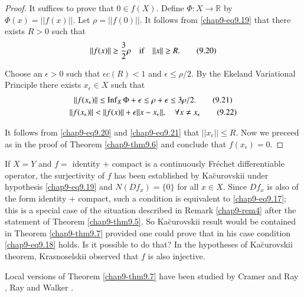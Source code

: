 \begin{proof}
It suffices to prove that $0\in f(X)$. Define $\Phi:X\to \mathbb{R}$
by $\Phi(x)=||f(x)||$. Let $\rho=||f(0)||$. It follows from
\eqref{chap9-eq9.19} that there exists $R>0$ such that
\begin{equation*}
||f(x)||\geq \frac{3}{2}\rho\quad \text{if}\quad ||x||\geq
R.\tag{9.20}\label{chap9-eq9.20} 
\end{equation*}

Choose an $\epsilon>0$ such that $\epsilon c(R)<1$ and $\epsilon\leq
\rho/2$. By the Ekeland Variational Principle there exists
$x_{\epsilon}\in X$ such that
\begin{gather*}
||f(x_{\epsilon})||\leq \Inf_{X}\Phi+\epsilon\leq \rho+\epsilon\leq
3\rho/2.\tag{9.21}\label{chap9-eq9.21}\\
||f(x_{\epsilon})||<||f(x)||+\epsilon||x-x_{\epsilon}||,\q\forall
x\neq x_{\epsilon}\tag{9.22}\label{chap9-eq9.22}
\end{gather*}

It follows from \eqref{chap9-eq9.20} and \eqref{chap9-eq9.21} that
$||x_{\epsilon}||\leq R$. Now we preceed as in the proof of Theorem
\ref{chap9-thm9.6} and conclude that $f(x_{\epsilon})=0$.
\end{proof}

\setcounter{remark}{0}
\begin{remark}\label{chap9-2rem1}
If $X=Y$ and $f=$ identity $+$ compact is a continuously Fr\'echet
differentiable operator, the surjectivity of $f$ has been established
by Ka\u{c}urovskii \cite{key50} under hypothesis \eqref{chap9-eq9.19}
and $N(Df_{x})=\{0\}$ for all $x\in X$. Since $Df_{x}$ is also of the
form identity $+$ compact, such a condition is equivalent to
\eqref{chap9-eq9.17}; this is a special case of the situation
described in Remark \ref{chap9-rem4} after the statement of Theorem
\ref{chap9-thm9.5}. So Ka\u{c}urovskii result would be contained in
Theorem \ref{chap9-thm9.7} provided one could prove that in his case
condition \eqref{chap9-eq9.18} holds. Is it possible to do that? In
the hypotheses of Ka\u{c}urovskii theorem, Krasnoselskii \cite{key54}
observed that $f$ is also injective.
\end{remark}

\begin{remark}\label{chap9-2rem2}
Local versions of Theorem \ref{chap9-thm9.7} have been studied by
Cramer and Ray \cite{key28}, Ray and Walker \cite{key69}.
\end{remark}

